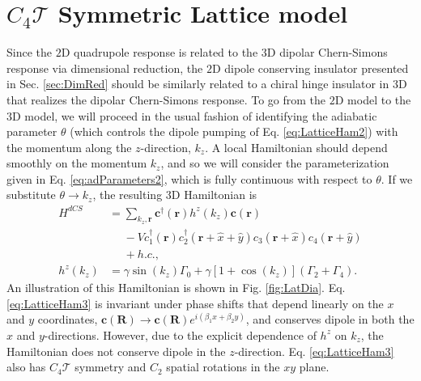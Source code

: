 \documentclass[prb,aps,twocolumn,groupaddress,floatfix]{revtex4-1}
\begin{document}
\section{$C_4\mathcal{T}$ Symmetric Lattice model} \label{sec:LatticeC}
Since the $2$D quadrupole response is related to the $3$D dipolar Chern-Simons response via dimensional reduction, the $2$D dipole conserving insulator presented in Sec. \ref{sec:DimRed} should be similarly related to a chiral hinge insulator in $3$D that realizes the dipolar Chern-Simons response. To go from the $2$D model to the $3$D model, we will proceed in the usual fashion of identifying the adiabatic parameter $\theta$ (which controls the dipole pumping of Eq. \ref{eq:LatticeHam2}) with the momentum along the $z$-direction, $k_z$. A local Hamiltonian should depend smoothly on the momentum $k_z$, and so we will consider the parameterization given in Eq. \ref{eq:adParameters2}, which is fully continuous with respect to $\theta$. If we substitute $\theta \rightarrow k_z$, the resulting $3$D Hamiltonian is 
\begin{equation}
\begin{split}
H^{dCS} &= \sum_{k_z, \bm{r}} \bm{c}^\dagger(\bm{r}) h^z(k_z) \bm{c}(\bm{r})\\&\phantom{=} - V c_1^\dagger(\bm{r})c^\dagger_2(\bm{r}+\hat{x}+\hat{y})c_3(\bm{r}+\hat{x})c_4(\bm{r}+\hat{y}) \\&\phantom{=}+ h.c.,\\
h^z(k_z) &= \gamma \sin(k_z) \Gamma_0 + \gamma[1+\cos(k_z)](\Gamma_2+\Gamma_4).
\end{split}\label{eq:LatticeHam3}
\end{equation}
An illustration of this Hamiltonian is shown in Fig. \ref{fig:LatDia}. Eq. \ref{eq:LatticeHam3} is invariant under phase shifts that depend linearly on the $x$ and $y$ coordinates, $\bm{c}(\bm{R})\rightarrow \bm{c}(\bm{R}) e^{ i (\beta_1 x + \beta_2 y )}$, and conserves dipole in both the $x$ and $y$-directions. However, due to the explicit dependence of $h^z$ on $k_z$, the Hamiltonian does not conserve dipole in the $z$-direction. Eq. \ref{eq:LatticeHam3} also has $C_4\mathcal{T}$ symmetry and $C_2$ spatial rotations in the $xy$ plane. 
\end{document}
